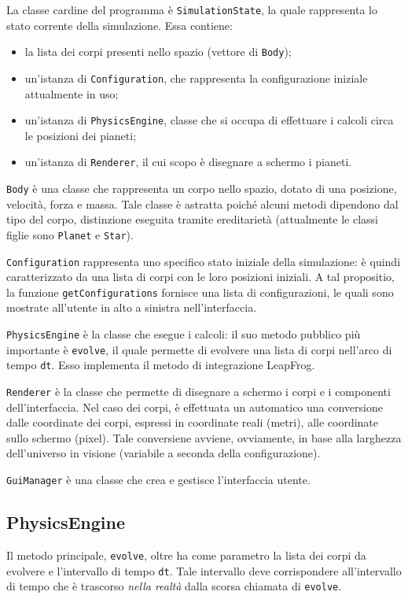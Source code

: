 \documentclass{article}
\begin{document}
La classe cardine del programma è \verb|SimulationState|, la quale rappresenta lo stato corrente della simulazione. Essa contiene:
\begin{itemize}
    \item la lista dei corpi presenti nello spazio (vettore di \verb|Body|);
    \item un'istanza di \verb|Configuration|, che rappresenta la configurazione iniziale attualmente in uso;
    \item un'istanza di \verb|PhysicsEngine|, classe che si occupa di effettuare i calcoli circa le posizioni dei pianeti;
    \item un'istanza di \verb|Renderer|, il cui scopo è disegnare a schermo i pianeti.
\end{itemize}

\verb|Body| è una classe che rappresenta un corpo nello spazio, dotato di una posizione, velocità, forza e massa. Tale classe è astratta poiché alcuni metodi dipendono dal tipo del corpo, distinzione eseguita tramite ereditarietà (attualmente le classi figlie sono \verb|Planet| e \verb|Star|).

\verb|Configuration| rappresenta uno specifico stato iniziale della simulazione: è quindi caratterizzato da una lista di corpi con le loro posizioni iniziali. A tal propositio, la funzione \verb|getConfigurations| fornisce una lista di configurazioni, le quali sono mostrate all'utente in alto a sinistra nell'interfaccia.

\verb|PhysicsEngine| è la classe che esegue i calcoli: il suo metodo pubblico più importante è \verb|evolve|, il quale permette di evolvere una lista di corpi nell'arco di tempo \verb|dt|. Esso implementa il metodo di integrazione LeapFrog.

\verb|Renderer| è la classe che permette di disegnare a schermo i corpi e i componenti dell'interfaccia. Nel caso dei corpi, è effettuata un automatico una conversione dalle coordinate dei corpi, espressi in coordinate reali (metri), alle coordinate sullo schermo (pixel). Tale conversiene avviene, ovviamente, in base alla larghezza dell'universo in visione (variabile a seconda della configurazione).

\verb|GuiManager| è una classe che crea e gestisce l'interfaccia utente.

\subsection{PhysicsEngine}
\label{physics_engine}
Il metodo principale, \verb|evolve|, oltre ha come parametro la lista dei corpi da evolvere e l'intervallo di tempo \verb|dt|. Tale intervallo deve corrispondere all'intervallo di tempo che è trascorso \textit{nella realtà} dalla scorsa chiamata di \verb|evolve|.
\end{document}
